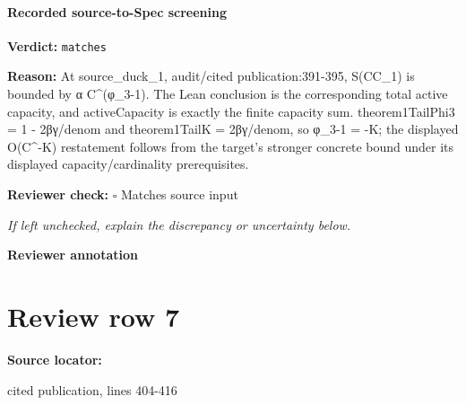 \documentclass[10pt]{article}
\newcommand{\reviewerbox}{%
  \par\noindent\fbox{\parbox{0.96\linewidth}{\rule{0pt}{0.38in}}}\par
}
\newcommand{\reviewmatch}[1]{%
  \par\noindent\textbf{Reviewer check:} $\square$\; #1\par
  \noindent\emph{If left unchecked, explain the discrepancy or uncertainty below.}\par
}
\begin{document}
\paragraph{Recorded source-to-Spec screening}
\textbf{Verdict:} \texttt{matches}
\\
{\raggedright
\textbf{Reason:} At source\_\allowbreak{}duck\_\allowbreak{}1, audit/\allowbreak{}cited publication:\allowbreak{}391-\allowbreak{}395, S(CC\_\allowbreak{}1) is bounded by α C\textasciicircum{}(φ\_\allowbreak{}3-\allowbreak{}1).\allowbreak{} The Lean conclusion is the corresponding total active capacity, and activeCapacity is exactly the finite capacity sum.\allowbreak{} theorem1TailPhi3 = 1 -\allowbreak{} 2βγ/\allowbreak{}denom and theorem1TailK = 2βγ/\allowbreak{}denom, so φ\_\allowbreak{}3-\allowbreak{}1 = -\allowbreak{}K;\allowbreak{} the displayed O(C\textasciicircum{}-\allowbreak{}K) restatement follows from the target's stronger concrete bound under its displayed capacity/\allowbreak{}cardinality prerequisites.\allowbreak{}
\par}
\reviewmatch{Matches source input}
\noindent\textbf{Reviewer annotation}\par
\reviewerbox
\clearpage
\hypertarget{source-claim-059a664ca2f2c12c}{}
\section*{Review row 7}
\textbf{Source locator:} {\footnotesize\raggedright cited publication, lines 404-\allowbreak{}416\par}
\end{document}
